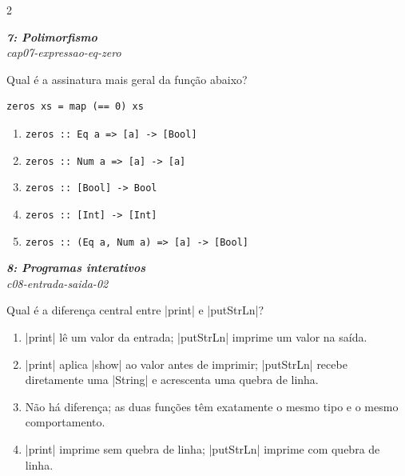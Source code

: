 \documentclass[a4paper,10pt,brazil]{article}
\begin{document}
\begin{multicols}{2}
\begin{flushright}
  \footnotesize
  \textit{\textbf{7: Polimorfismo}}\\
  \textit{cap07-expressao-eq-zero}\\

\end{flushright}
Qual é a assinatura mais geral da função abaixo?

\begin{verbatim}
zeros xs = map (== 0) xs
\end{verbatim}

\begin{enumerate}
  \item \texttt{zeros :: Eq a => [a] -> [Bool]}
  \item \texttt{zeros :: Num a => [a] -> [a]}
  \item \texttt{zeros :: [Bool] -> Bool}
  \item \texttt{zeros :: [Int] -> [Int]}
  \item \texttt{zeros :: (Eq a, Num a) => [a] -> [Bool]}

\end{enumerate}

\begin{flushright}
  \footnotesize
  \textit{\textbf{8: Programas interativos}}\\
  \textit{c08-entrada-saida-02}\\

\end{flushright}
Qual é a diferença central entre \haskellinline|print| e \haskellinline|putStrLn|?

\begin{enumerate}
  \item \haskellinline|print| lê um valor da entrada; \haskellinline|putStrLn| imprime um valor na saída.

  \item \haskellinline|print| aplica \haskellinline|show| ao valor antes de imprimir; \haskellinline|putStrLn| recebe diretamente uma \haskellinline|String| e acrescenta uma quebra de linha.

  \item Não há diferença; as duas funções têm exatamente o mesmo tipo e o mesmo comportamento.

  \item \haskellinline|print| imprime sem quebra de linha; \haskellinline|putStrLn| imprime com quebra de linha.


\end{enumerate}
\end{multicols}
\end{document}
